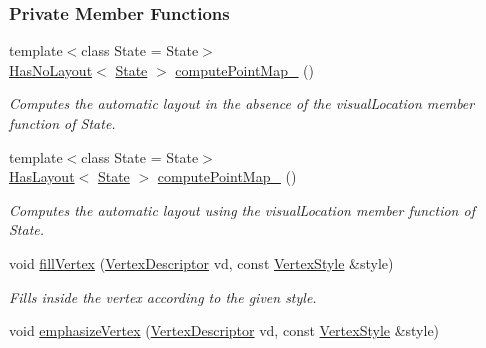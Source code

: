 \subsubsection*{Private Member Functions}
\begin{DoxyCompactItemize}
\item 
{\footnotesize template$<$class State  = State$>$ }\\\hyperlink{namespaceslb_1_1core_1_1ui_af200efa9fbb401dd541fa80e687e0264}{Has\+No\+Layout}$<$ \hyperlink{structslb_1_1core_1_1ui_1_1Drawer_adf9110c216aa1d0a5080547a3bc22f06}{State} $>$ \hyperlink{structslb_1_1core_1_1ui_1_1Drawer_adadbebe7db523e3888c6f740840cf7d2}{compute\+Point\+Map\+\_\+} ()
\begin{DoxyCompactList}\small\item\em Computes the automatic layout in the absence of the {\ttfamily visual\+Location} member function of {\ttfamily State}. \end{DoxyCompactList}\item 
{\footnotesize template$<$class State  = State$>$ }\\\hyperlink{namespaceslb_1_1core_1_1ui_a9bf16cc2a70201a2d10994dbffbe094f}{Has\+Layout}$<$ \hyperlink{structslb_1_1core_1_1ui_1_1Drawer_adf9110c216aa1d0a5080547a3bc22f06}{State} $>$ \hyperlink{structslb_1_1core_1_1ui_1_1Drawer_ae26d220bbf7e1c774570ff91dd57d68b}{compute\+Point\+Map\+\_\+} ()
\begin{DoxyCompactList}\small\item\em Computes the automatic layout using the {\ttfamily visual\+Location} member function of {\ttfamily State}. \end{DoxyCompactList}\item 
void \hyperlink{structslb_1_1core_1_1ui_1_1Drawer_ab7b5c9f69f03b5b5f515ab2db5c10d30}{fill\+Vertex} (\hyperlink{structslb_1_1core_1_1ui_1_1Drawer_a3106bd6b1354ea4a24c3ef169c1e18b8}{Vertex\+Descriptor} vd, const \hyperlink{structslb_1_1core_1_1ui_1_1VertexStyle}{Vertex\+Style} \&style)
\begin{DoxyCompactList}\small\item\em Fills inside the vertex according to the given style. \end{DoxyCompactList}\item 
void \hyperlink{structslb_1_1core_1_1ui_1_1Drawer_a897c99eafc0805ec03b876290c39b4c4}{emphasize\+Vertex} (\hyperlink{structslb_1_1core_1_1ui_1_1Drawer_a3106bd6b1354ea4a24c3ef169c1e18b8}{Vertex\+Descriptor} vd, const \hyperlink{structslb_1_1core_1_1ui_1_1VertexStyle}{Vertex\+Style} \&style)

\end{DoxyCompactItemize}
